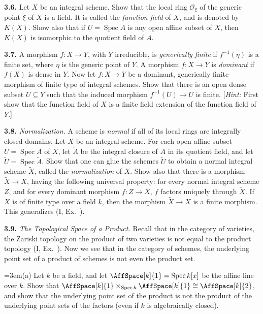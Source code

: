 {\smallskip
\noindent\hypertarget{ex-II-3.6}{}\textbf{3.6.} Let $X$ be an integral scheme. Show that the local ring $\mathcal O_\xi$ of the generic point $\xi$ of $X$ is a field. It is called the \emph{function field} of $X$, and is denoted by $K(X)$. Show also that if $U=\operatorname{Spec} A$ is any \EditionText{}open affine subset of $X$, then $K(X)$ is isomorphic to the quotient field of $A$.

\smallskip
\noindent\hypertarget{ex-II-3.7}{}\textbf{3.7.} A morphism $f\colon X\to Y$, with $Y$ irreducible, is \emph{generically finite} if $f^{-1}(\eta)$ is a finite set, where $\eta$ is the generic point of $Y$. A morphism $f\colon X\to Y$ is \emph{dominant} if $f(X)$ is dense in $Y$. Now let $f\colon X\to Y$ be a dominant, generically finite morphism of finite type of integral schemes. Show that there is an open dense subset $U\subseteq Y$ such that the induced morphism $f^{-1}(U)\to U$ is finite. [\emph{Hint:} First show that the function field of $X$ is a finite field extension of the function field of $Y$.]

\smallskip
\noindent\hypertarget{ex-II-3.8}{}\textbf{3.8.} \emph{Normalization.} A scheme is \emph{normal} if all of its local rings are integrally closed domains. Let $X$ be an integral scheme. For each \EditionText{}open affine subset $U=\operatorname{Spec} A$ of $X$, let $\widetilde A$ be the integral closure of $A$ in its quotient field, and let $\widetilde U=\operatorname{Spec}\widetilde A$. Show that one can glue the schemes $\widetilde U$ to obtain a normal integral scheme $\widetilde X$, called the \emph{normalization} of $X$. Show also that there is a morphism $\widetilde X\to X$, having the following universal property: for every normal integral scheme $Z$, and for every dominant morphism $f\colon Z\to X$, $f$ factors uniquely through $\widetilde X$. If $X$ is of finite type over a field $k$, then the morphism $\widetilde X\to X$ is a finite morphism. This generalizes (I, Ex.~).

\smallskip
\noindent\hypertarget{ex-II-3.9}{}\textbf{3.9.} \emph{The Topological Space of a Product.} Recall that in the category of varieties, the Zariski topology on the product of two varieties is not equal to the product topology (I, Ex.~). Now we see that in the category of schemes, the underlying point set of a product of schemes is not even the product set.

\noindent\hangindent=3em\hspace*{1.7em}(a) Let $k$ be a field, and let $\AffSpace[k]{1}=\operatorname{Spec} k[x]$ be the affine line over $k$. Show that $\AffSpace[k]{1}\times_{\operatorname{Spec}k}\AffSpace[k]{1}\cong\AffSpace[k]{2}$, and show that the underlying point set of the product is not the product of the underlying point sets of the factors (even if $k$ is algebraically closed).}
